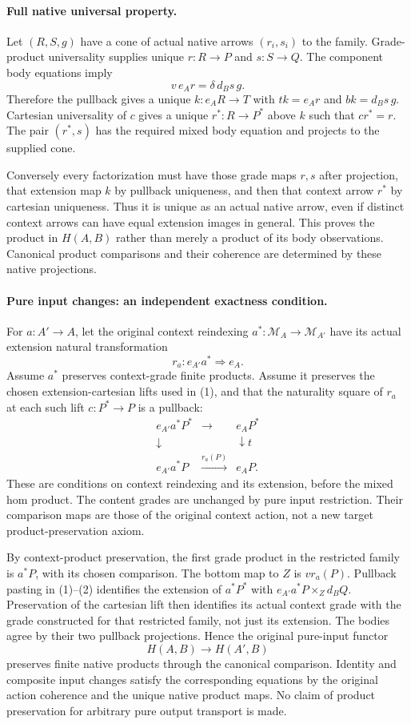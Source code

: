 \documentclass{article}
\begin{document}
\paragraph{Full native universal property.} Let $(R,S,g)$ have a cone of actual native arrows $(r_i,s_i)$ to the family. Grade-product universality supplies unique $r:R\to P$ and $s:S\to Q$. The component body equations imply
\[
 v\,e_A r=\delta\,d_Bs\,g.
\]
Therefore the pullback gives a unique $k:e_AR\to T$ with $tk=e_Ar$ and $bk=d_Bs\,g$. Cartesian universality of $c$ gives a unique $r^*:R\to P^*$ above $k$ such that $cr^*=r$. The pair $(r^*,s)$ has the required mixed body equation and projects to the supplied cone.

Conversely every factorization must have those grade maps $r,s$ after projection, that extension map $k$ by pullback uniqueness, and then that context arrow $r^*$ by cartesian uniqueness. Thus it is unique as an actual native arrow, even if distinct context arrows can have equal extension images in general. This proves the product in $H(A,B)$ rather than merely a product of its body observations. Canonical product comparisons and their coherence are determined by these native projections.

\paragraph{Pure input changes: an independent exactness condition.} For $a:A'\to A$, let the original context reindexing $a^*:\mathcal M_A\to\mathcal M_{A'}$ have its actual extension natural transformation
\[
 r_a:e_{A'}a^*\Rightarrow e_A.
\]
Assume $a^*$ preserves context-grade finite products. Assume it preserves the chosen extension-cartesian lifts used in (1), and that the naturality square of $r_a$ at each such lift $c:P^*\to P$ is a pullback:
\[
 \begin{array}{ccc}
 e_{A'}a^*P^*&\longrightarrow&e_AP^*\\
 \downarrow&&\downarrow t\\
 e_{A'}a^*P&\xrightarrow{r_a(P)}&e_AP.
 \end{array}
\tag{2}
\]
These are conditions on context reindexing and its extension, before the mixed hom product. The content grades are unchanged by pure input restriction. Their comparison maps are those of the original context action, not a new target product-preservation axiom.

By context-product preservation, the first grade product in the restricted family is $a^*P$, with its chosen comparison. The bottom map to $Z$ is $v r_a(P)$. Pullback pasting in (1)--(2) identifies the extension of $a^*P^*$ with
$e_{A'}a^*P\times_Zd_BQ$. Preservation of the cartesian lift then identifies its actual context grade with the grade constructed for that restricted family, not just its extension. The bodies agree by their two pullback projections. Hence the original pure-input functor
\[
 H(A,B)\longrightarrow H(A',B)
\]
preserves finite native products through the canonical comparison. Identity and composite input changes satisfy the corresponding equations by the original action coherence and the unique native product maps. No claim of product preservation for arbitrary pure output transport is made.
\end{document}
